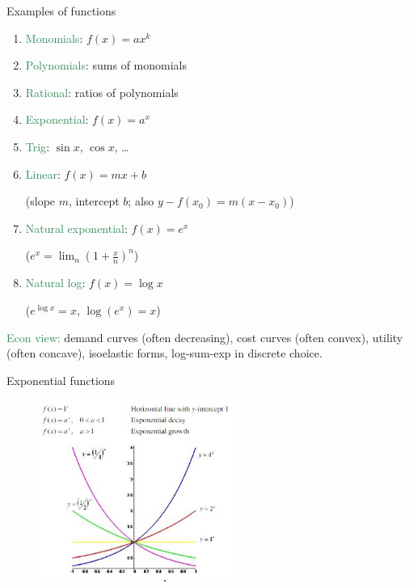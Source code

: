 \documentclass[11pt,aspectratio=169]{beamer}
\begin{document}
\begin{frame}{Examples of functions}

\begin{enumerate}
\item \textcolor{SeaGreen}{Monomials}: $f(x)=a x^k$
\item \textcolor{SeaGreen}{Polynomials}: sums of monomials
\item \textcolor{SeaGreen}{Rational}: ratios of polynomials
\item \textcolor{SeaGreen}{Exponential}: $f(x)=a^x$
\item \textcolor{SeaGreen}{Trig}: $\sin x$, $\cos x$, \ldots
\item \textcolor{SeaGreen}{Linear}: $f(x)=mx+b$ \begin{tiny}(slope $m$, intercept $b$; also $y-f(x_0)=m(x-x_0)$)\end{tiny}
\item \textcolor{SeaGreen}{Natural exponential}: $f(x)=e^x$ \begin{tiny}($e^x=\lim_n (1+\frac{x}{n})^n$)\end{tiny}
\item \textcolor{SeaGreen}{Natural log}: $f(x)=\log x$ \begin{tiny}($e^{\log x}=x$, $\log(e^x)=x$)\end{tiny}
\end{enumerate}

\smallskip
\textcolor{SeaGreen}{Econ view:} demand curves (often decreasing), cost curves (often convex), utility (often concave), isoelastic forms, log-sum-exp in discrete choice.
\end{frame}

\begin{frame}{Exponential functions}
\begin{figure}
\includegraphics[width=2.5in]{img/exp} 
\end{figure}
\end{frame}
\end{document}

